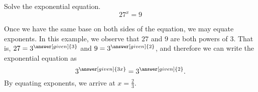 \documentclass{ximera}
\begin{document}
 \begin{example}
Solve the exponential equation.
\[
27^x=9
\]
\end{example}
 \begin{explanation}
Once we have the same base on both sides of the equation, we may equate exponents.  In this example, we observe that $27$ and $9$ are both powers of $3$.  That is, $27=3^{\answer[given]{3}}$ and $9=3^{\answer[given]{2}}$, and therefore we can write the exponential equation as 
 \[
3^{\answer[given]{3x}}=3^{\answer[given]{2}}.
\]
By equating exponents, we arrive at $x=\frac{2}{3}$.
\end{explanation}
 
 
\end{document}
